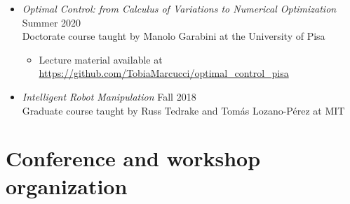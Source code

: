 \documentclass[11pt,a4paper,sans]{moderncv}
\begin{document}
\begin{itemize}

\item \textit{Optimal Control: from Calculus of Variations to Numerical Optimization} \hfill Summer 2020 \\
Doctorate course taught by Manolo Garabini at the University of Pisa
\begin{itemize}
\item
Lecture material available at \href{https://github.com/TobiaMarcucci/optimal_control_pisa}{\color{cyan}https://github.com/TobiaMarcucci/optimal\_control\_pisa}
\end{itemize}

\item \textit{Intelligent Robot Manipulation} \hfill Fall 2018 \\
Graduate course taught by Russ Tedrake and Tom\'{a}s Lozano-P\'{e}rez at MIT

\end{itemize}

%

\section{Conference and workshop organization}

\vspace{5pt}
\end{document}
